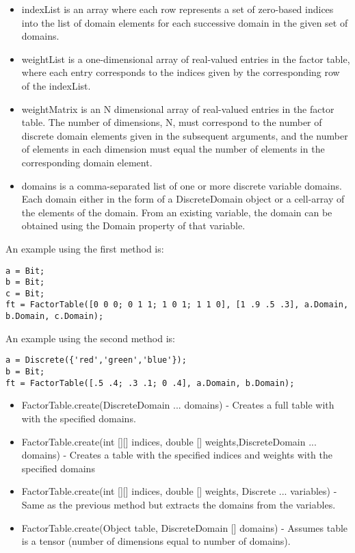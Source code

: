 \begin{itemize}
\item indexList is an array where each row represents a set of zero-based indices into the list of domain elements for each successive domain in the given set of domains.
\item weightList is a one-dimensional array of real-valued entries in the factor table, where each entry corresponds to the indices given by the corresponding row of the indexList.
\item weightMatrix is an N dimensional array of real-valued entries in the factor table.  The number of dimensions, N, must correspond to the number of discrete domain elements given in the subsequent arguments, and the number of elements in each dimension must equal the number of elements in the corresponding domain element.
\item domains is a comma-separated list of one or more discrete variable domains.  Each domain either in the form of a DiscreteDomain object or a cell-array of the elements of the domain.  From an existing variable, the domain can be obtained using the Domain property of that variable.
\end{itemize}

An example using the first method is:
\begin{lstlisting}
a = Bit;
b = Bit;
c = Bit;
ft = FactorTable([0 0 0; 0 1 1; 1 0 1; 1 1 0], [1 .9 .5 .3], a.Domain, b.Domain, c.Domain);
\end{lstlisting}

An example using the second method is:
\begin{lstlisting}
a = Discrete({'red','green','blue'});
b = Bit;
ft = FactorTable([.5 .4; .3 .1; 0 .4], a.Domain, b.Domain);
\end{lstlisting}

\fi

\ifjava

\begin{itemize}
\item FactorTable.create(DiscreteDomain ... domains) - Creates a full table with with the specified domains.
\item FactorTable.create(int [][] indices, double [] weights,DiscreteDomain ... domains) - Creates a table with the specified indices and weights with the specified domains
\item FactorTable.create(int [][] indices, double [] weights, Discrete ... variables) - Same as the previous method but extracts the domains from the variables.
\item FactorTable.create(Object table, DiscreteDomain [] domains) - Assumes table is a tensor (number of dimensions equal to number of domains).  
\end{itemize}

